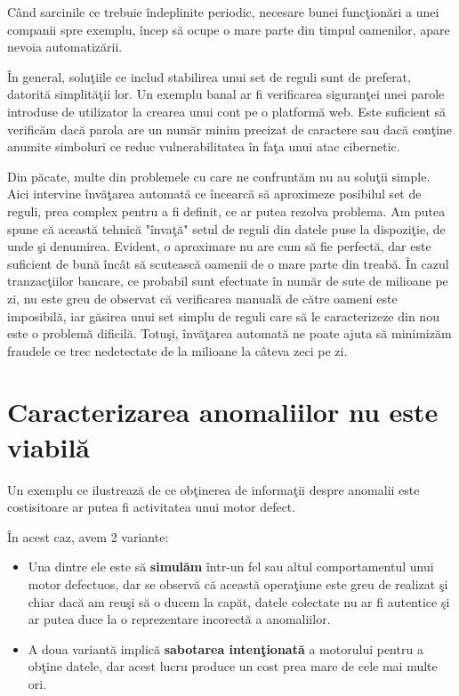 Când sarcinile ce trebuie îndeplinite periodic, necesare bunei funcţionări a unei 
companii spre exemplu, încep să ocupe o mare parte din timpul oamenilor, apare 
nevoia automatizării. 

În general, soluţiile ce includ stabilirea unui set de reguli
sunt de preferat, datorită simplităţii lor. Un exemplu banal ar fi verificarea 
siguranţei unei parole introduse de utilizator la crearea unui cont pe o platformă
web. Este suficient să verificăm dacă parola are un număr minim precizat de caractere 
sau dacă conţine anumite simboluri ce reduc vulnerabilitatea în faţa unui atac cibernetic.

Din păcate, multe din problemele cu care ne confruntăm nu au soluţii simple. 
Aici intervine învăţarea automată ce încearcă să aproximeze posibilul set de reguli, 
prea complex pentru a fi definit, ce ar putea rezolva problema. Am putea spune că 
această tehnică "învaţă" setul de reguli 
din datele puse la dispoziţie, de unde şi denumirea. Evident, o aproximare 
nu are cum să fie perfectă, dar este suficient de bună încât să scutească oamenii de 
o mare parte din treabă. În cazul tranzacţiilor bancare, ce probabil sunt efectuate 
în număr de sute de milioane pe zi, nu este greu de observat că verificarea manuală
de către oameni este imposibilă, iar găsirea unui set simplu de reguli care să 
le caracterizeze din nou este o problemă dificilă. Totuşi, învăţarea automată 
ne poate ajuta să minimizăm fraudele ce trec nedetectate de la milioane la câteva zeci
pe zi.

\section{Caracterizarea anomaliilor nu este viabilă}

Un exemplu ce ilustrează de ce obţinerea de informaţii
despre anomalii este costisitoare ar putea fi activitatea unui
motor defect.

În acest caz, avem 2 variante:
\begin{itemize}
    \item Una dintre ele 
        este să \textbf{simulăm} 
        într-un fel sau altul comportamentul unui motor defectuos, dar 
        se observă că această operaţiune este greu de realizat şi chiar dacă am reuşi 
        să o ducem la capăt, datele colectate nu ar fi autentice şi ar putea duce 
        la o reprezentare incorectă a anomaliilor. 

    \item A doua variantă implică \textbf{sabotarea 
        intenţionată} a motorului pentru a obţine datele, dar acest lucru produce un 
        cost prea mare de cele mai multe ori. 
\end{itemize}


